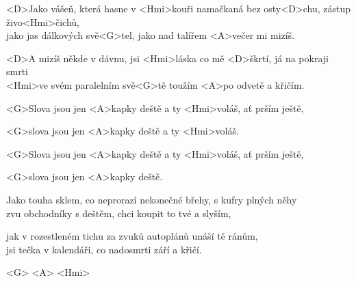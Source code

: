 
\zs
<D>Jako vášeň, která hasne v <Hmi>kouři
namačkaná bez osty<D>chu, zástup živo<Hmi>čichů, \\
jako jas dálkových svě<G>tel, jako nad talířem <A>večer
mi mizíš.

<D>A mizíš někde v dávnu,
jsi <Hmi>láska co mě <D>škrtí, já na pokraji smrti \\
<Hmi>ve svém paralelním svě<G>tě toužím <A>po odvetě
a křičím.
\ks
\zr

<G>Slova jsou jen <A>kapky deště a ty <Hmi>voláš, ať prším ještě,

<G>slova jsou jen <A>kapky deště a ty <Hmi>voláš.

<G>Slova jsou jen <A>kapky deště a ty <Hmi>voláš, ať prším 
ještě,

<G>slova jsou jen <A>kapky deště.

\kr
\zs

Jako touha sklem, co neprorazí
nekonečné břehy, s kufry plných něhy \\
zvu obchodníky s deštěm, chci koupit to tvé 
a slyším,

jak v rozestleném tichu
za zvuků autoplánů unáší tě ránům, \\
jsi tečka v kalendáři, co nadosmrti září
a křičí.

\ks
\zr
\kr
\zs

<G> <A> <Hmi> 
\ks
\zr
\kr
\kp
